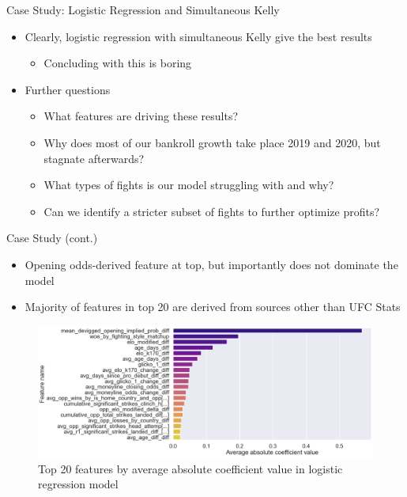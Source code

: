 \documentclass[aspectratio=169,xcolor=dvipsnames]{beamer}
\begin{document}

\begin{frame}{Case Study: Logistic Regression and Simultaneous Kelly}
    \begin{itemize}
        \item Clearly, logistic regression with simultaneous Kelly give the best results
        \begin{itemize}
            \item Concluding with this is boring
        \end{itemize}

        \item Further questions
        \begin{itemize}
            \item What features are driving these results?

            \item Why does most of our bankroll growth take place 2019 and 2020, but stagnate afterwards?

            \item What types of fights is our model struggling with and why?

            \item Can we identify a stricter subset of fights to further optimize profits?
        \end{itemize}
    \end{itemize}
\end{frame}


\begin{frame}{Case Study (cont.)}
    \begin{itemize}
        \item Opening odds-derived feature at top, but importantly does not dominate the model

        \item Majority of features in top 20 are derived from sources other than UFC Stats
    \end{itemize}
    \begin{figure}
        \centering
        \includegraphics[width=0.65\linewidth]{figures/lr_feature_avg_abs_coef.png}
        \caption{Top 20 features by average absolute coefficient value in logistic regression model}
    \end{figure}
\end{frame}
\end{document}
